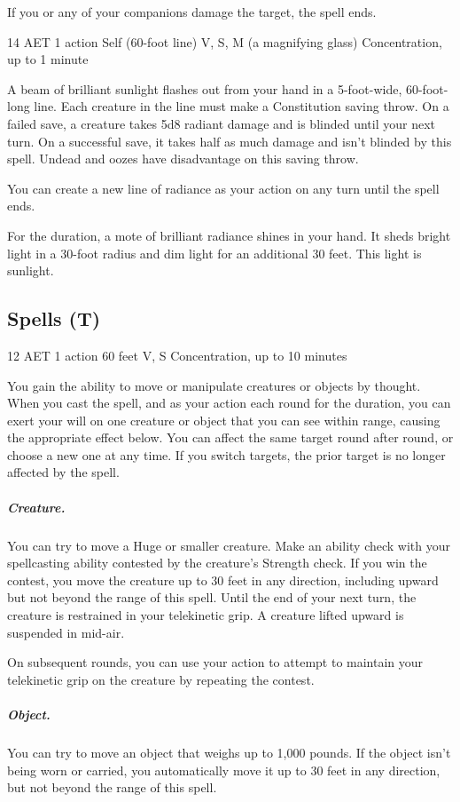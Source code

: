 If you or any of your companions damage the target, the spell ends.


{14 AET}
{1 action}
{Self (60-foot line)}
{V, S, M (a magnifying glass)}
{Concentration, up to 1 minute}

A beam of brilliant sunlight flashes out from your hand in a 5-foot-wide, 60-foot-long line. Each creature in the line must make a Constitution saving throw. On a failed save, a creature takes 5d8 radiant damage and is blinded until your next turn. On a successful save, it takes half as much damage and isn't blinded by this spell. Undead and oozes have disadvantage on this saving throw.

You can create a new line of radiance as your action on any turn until the spell ends.

For the duration, a mote of brilliant radiance shines in your hand. It sheds bright light in a 30-foot radius and dim light for an additional 30 feet. This light is sunlight.

\subsection{Spells (T)}


{12 AET}
{1 action}
{60 feet}
{V, S}
{Concentration, up to 10 minutes}

You gain the ability to move or manipulate creatures or objects by thought. When you cast the spell, and as your action each round for the duration, you can exert your will on one creature or object that you can see within range, causing the appropriate effect below. You can affect the same target round after round, or choose a new one at any time. If you switch targets, the prior target is no longer affected by the spell.

\subparagraph*{Creature.} You can try to move a Huge or smaller creature. Make an ability check with your spellcasting ability contested by the creature's Strength check. If you win the contest, you move the creature up to 30 feet in any direction, including upward but not beyond the range of this spell. Until the end of your next turn, the creature is restrained in your telekinetic grip. A creature lifted upward is suspended in mid-air.

On subsequent rounds, you can use your action to attempt to maintain your telekinetic grip on the creature by repeating the contest.

\subparagraph*{Object.} You can try to move an object that weighs up to 1,000 pounds. If the object isn't being worn or carried, you automatically move it up to 30 feet in any direction, but not beyond the range of this spell.

